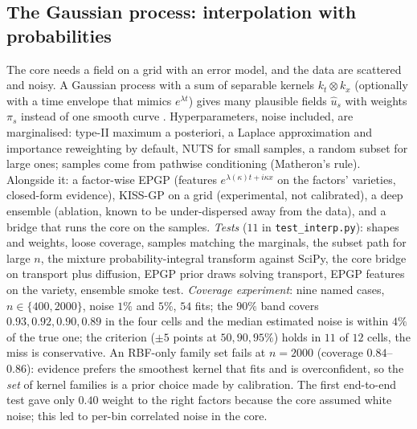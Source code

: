 \documentclass[11pt]{article}
\theoremstyle{plain}
\theoremstyle{definition}
\theoremstyle{remark}
\begin{document}
\subsection{The Gaussian process: interpolation with probabilities}\label{sec:gp}
The core needs a field on a grid with an error model, and the data are scattered and noisy. A Gaussian process with a sum of separable kernels $k_t\otimes k_x$ (optionally with a time envelope that mimics $e^{\lambda t}$)
gives many plausible fields $\hat u_s$ with weights $\pi_s$ instead of one smooth curve \cite{RasWil06}. Hyperparameters, noise included, are marginalised: type-II maximum a posteriori, a Laplace approximation and importance reweighting by default,
NUTS for small samples, a random subset for large ones; samples come from pathwise conditioning (Matheron's rule). Alongside it: a factor-wise EPGP (features $e^{\lambda(\kappa)t+i\kappa x}$ on the factors' varieties, closed-form evidence),
KISS-GP on a grid (experimental, not calibrated), a deep ensemble (ablation, known to be under-dispersed away from the data), and a bridge that runs the core on the samples.
\emph{Tests} ($11$ in \texttt{test\_interp.py}): shapes and weights, loose coverage, samples matching the marginals, the subset path for large $n$, the mixture probability-integral transform against SciPy, the core bridge on transport plus diffusion,
EPGP prior draws solving transport, EPGP features on the variety, ensemble smoke test.
\emph{Coverage experiment}: nine named cases, $n\in\{400,2000\}$, noise $1\%$ and $5\%$, $54$ fits; the $90\%$ band covers $0.93, 0.92, 0.90, 0.89$ in the four cells and the median estimated noise is within $4\%$ of the true one; the criterion ($\pm5$ points at $50,90,95\%$) holds in $11$ of $12$ cells, the miss is conservative.
An RBF-only family set fails at $n=2000$ (coverage $0.84$--$0.86$): evidence prefers the smoothest kernel that fits and is overconfident, so the \emph{set} of kernel families is a prior choice made by calibration.
The first end-to-end test gave only $0.40$ weight to the right factors because the core assumed white noise; this led to per-bin correlated noise in the core.
\end{document}
